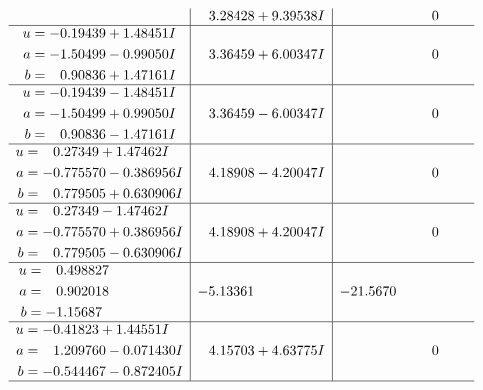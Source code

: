 \documentclass[1p]{elsarticle_modified}
\theoremstyle{definition}
\begin{document}
$$\begin{array}{c|c|c}
 & \phantom{-}3.28428 + 9.39538 I & \phantom{-0.000000 } 0 \\ \hline\begin{aligned}
u &= -0.19439 + 1.48451 I \\
a &= -1.50499 - 0.99050 I \\
b &= \phantom{-}0.90836 + 1.47161 I\end{aligned}
 & \phantom{-}3.36459 + 6.00347 I & \phantom{-0.000000 } 0 \\ \hline\begin{aligned}
u &= -0.19439 - 1.48451 I \\
a &= -1.50499 + 0.99050 I \\
b &= \phantom{-}0.90836 - 1.47161 I\end{aligned}
 & \phantom{-}3.36459 - 6.00347 I & \phantom{-0.000000 } 0 \\ \hline\begin{aligned}
u &= \phantom{-}0.27349 + 1.47462 I \\
a &= -0.775570 - 0.386956 I \\
b &= \phantom{-}0.779505 + 0.630906 I\end{aligned}
 & \phantom{-}4.18908 - 4.20047 I & \phantom{-0.000000 } 0 \\ \hline\begin{aligned}
u &= \phantom{-}0.27349 - 1.47462 I \\
a &= -0.775570 + 0.386956 I \\
b &= \phantom{-}0.779505 - 0.630906 I\end{aligned}
 & \phantom{-}4.18908 + 4.20047 I & \phantom{-0.000000 } 0 \\ \hline\begin{aligned}
u &= \phantom{-}0.498827\phantom{ +0.000000I} \\
a &= \phantom{-}0.902018\phantom{ +0.000000I} \\
b &= -1.15687\phantom{ +0.000000I}\end{aligned}
 & -5.13361\phantom{ +0.000000I} & -21.5670\phantom{ +0.000000I} \\ \hline\begin{aligned}
u &= -0.41823 + 1.44551 I \\
a &= \phantom{-}1.209760 - 0.071430 I \\
b &= -0.544467 - 0.872405 I\end{aligned}
 & \phantom{-}4.15703 + 4.63775 I & \phantom{-0.000000 } 0\\
 \hline 
 \end{array}$$\newpage$$\begin{array}{c|c|c}  

\end{array}$$
\end{document}

